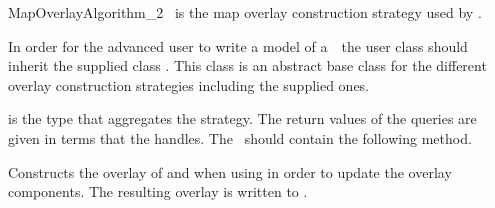 
\ccRefPageBegin


\renewcommand{\ccRefPageBegin}{\begin{ccAdvanced}}
\renewcommand{\ccRefPageEnd}{\end{ccAdvanced}}

\begin{ccRefConcept}{MapOverlayAlgorithm_2}
\label{OVL_sec:base}
\ccDefinition
\ccRefName\ is the map overlay construction strategy used by .

In order for the advanced user to write a model of a~\ccRefName\ 
the user class should inherit the \cgal\/ supplied class 
.
This class is an abstract base class for the different overlay 
construction strategies including the supplied ones.

 is the
type that aggregates the strategy. The return values of the queries
are given in terms that the  handles.
The \ccRefName\ should contain the following method.


\ccOperations
{}

   {Constructs the overlay of  and  when 
      using \ccStyle{notifier} in order to update the overlay components.
      The resulting overlay is written to \ccStyle{result}.}

\ccHasModels
   \\
   \\

\end{ccRefConcept}
\renewcommand{\ccRefPageBegin}{}
\renewcommand{\ccRefPageEnd}{}

\ccRefPageEnd
